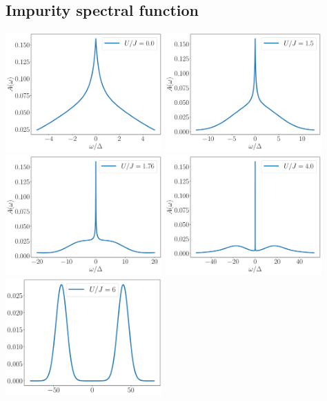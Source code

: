 \documentclass{report}
\numberwithin{equation}{section}
\begin{document}
\subsection*{Impurity spectral function}
\begin{center}
	\includegraphics[width=0.45\textwidth]{../figures/spec_func_U_by_J=0.00.pdf}
	\includegraphics[width=0.45\textwidth]{../figures/spec_func_U_by_J=1.50.pdf}\\
	\includegraphics[width=0.45\textwidth]{../figures/spec_func_U_by_J=1.76.pdf}
	\includegraphics[width=0.45\textwidth]{../figures/spec_func_U_by_J=4.00.pdf}\\
	\includegraphics[width=0.45\textwidth]{../figures/spec_func_U_by_J=6.00.pdf}
\end{center}
\end{document}

